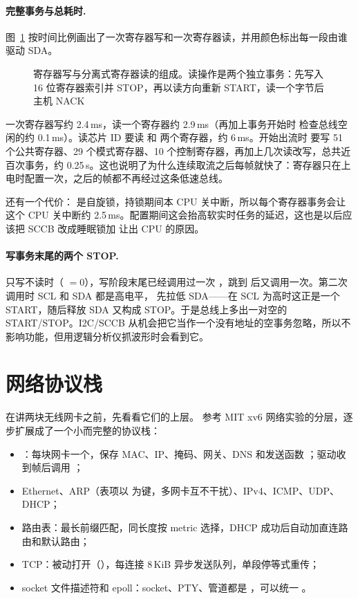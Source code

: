 \paragraph{完整事务与总耗时.} 图~\ref{fig:sccb-trans} 按时间比例画出了一次寄存器写和一次寄存器读，并用颜色标出每一段由谁驱动 SDA。

\begin{figure}[htbp]
  \centering
  
  \caption{寄存器写与分离式寄存器读的组成。读操作是两个独立事务：先写入 16 位寄存器索引并 STOP，再以读方向重新 START，读一个字节后主机 NACK}
  \label{fig:sccb-trans}
\end{figure}

一次寄存器写约 2.4\,ms，读一个寄存器约 2.9\,ms（再加上事务开始时  检查总线空闲的约 0.1\,ms）。读芯片 ID 要读  和  两个寄存器，约 6\,ms。开始出流时  要写 51 个公共寄存器、29 个模式寄存器、10 个控制寄存器，再加上几次读改写，总共近百次事务，约 0.25\,s。这也说明了为什么连续取流之后每帧就快了：寄存器只在上电时配置一次，之后的帧都不再经过这条低速总线。

还有一个代价： 是自旋锁，持锁期间本 CPU 关中断，所以每个寄存器事务会让这个 CPU 关中断约 2.5\,ms。配置期间这会抬高软实时任务的延迟，这也是以后应该把 SCCB 改成睡眠锁加  让出 CPU 的原因。

\paragraph{写事务末尾的两个 STOP.} 只写不读时（ $=0$），写阶段末尾已经调用过一次 ，跳到  后又调用一次。第二次调用时 SCL 和 SDA 都是高电平， 先拉低 SDA——在 SCL 为高时这正是一个 START，随后释放 SDA 又构成 STOP。于是总线上多出一对空的 START/STOP。I2C/SCCB 从机会把它当作一个没有地址的空事务忽略，所以不影响功能，但用逻辑分析仪抓波形时会看到它。

\section{网络协议栈}

在讲两块无线网卡之前，先看看它们的上层。 参考 MIT xv6 网络实验的分层，逐步扩展成了一个小而完整的协议栈：

\begin{itemize}
  \item {}：每块网卡一个，保存 MAC、IP、掩码、网关、DNS 和发送函数 ；驱动收到帧后调用 ；
  \item Ethernet、ARP（表项以  为键，多网卡互不干扰）、IPv4、ICMP、UDP、DHCP；
  \item 路由表：最长前缀匹配，同长度按 metric 选择，DHCP 成功后自动加直连路由和默认路由；
  \item TCP：被动打开（），每连接 8\,KiB 异步发送队列，单段停等式重传；
  \item socket 文件描述符和 epoll：socket、PTY、管道都是 ，可以统一 。
\end{itemize}

